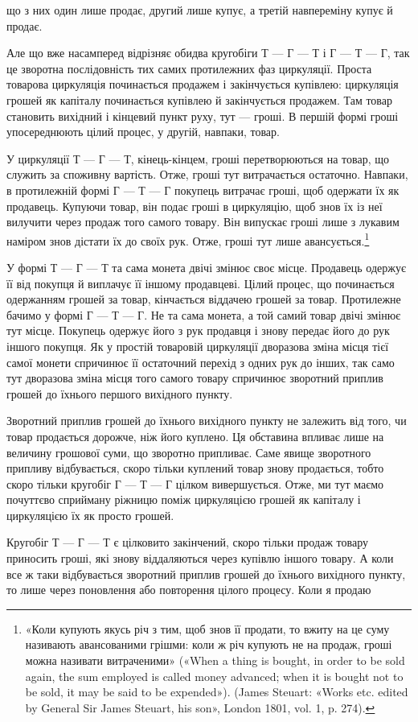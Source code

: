 що з них один лише продає, другий лише купує, а третій навпереміну
купує й продає.

Але що вже насамперед відрізняє обидва кругобіги Т — Г — Т
і Г — Т — Г, так це зворотна послідовність тих самих протилежних
фаз циркуляції. Проста товарова циркуляція починається
продажем і закінчується купівлею: циркуляція грошей як капіталу
починається купівлею й закінчується продажем. Там
товар становить вихідний і кінцевий пункт руху, тут — гроші.
В першій формі гроші упосереднюють цілий процес, у другій,
навпаки, товар.

У циркуляції Т — Г — Т, кінець-кінцем, гроші перетворюються
на товар, що служить за споживну вартість. Отже, гроші
тут витрачається остаточно. Навпаки, в протилежній формі
Г — Т — Г покупець витрачає гроші, щоб одержати їх як продавець.
Купуючи товар, він подає гроші в циркуляцію, щоб
знов їх із неї вилучити через продаж того самого товару. Він
випускає гроші лише з лукавим наміром знов дістати їх до своїх
рук. Отже, гроші тут лише авансується.\footnote{
«Коли купують якусь річ з тим, щоб знов її продати, то вжиту
на це суму називають авансованими грішми: коли ж річ купують не
на продаж, гроші можна називати витраченими» («When a thing is bought,
in order to be sold again, the sum employed is called money advanced;
when it is bought not to be sold, it may be said to be expended»). (James
Steuart: «Works etc. edited by General Sir James Steuart, his son», London
1801, vol. 1, p. 274).
}

У формі Т — Г — Т та сама монета двічі змінює своє місце.
Продавець одержує її від покупця й виплачує її іншому продавцеві.
Цілий процес, що починається одержанням грошей за товар,
кінчається віддачею грошей за товар. Протилежне бачимо у
формі Г — Т — Г. Не та сама монета, а той самий товар двічі
змінює тут місце. Покупець одержує його з рук продавця і знову
передає його до рук іншого покупця. Як у простій товаровій
циркуляції дворазова зміна місця тієї самої монети спричинює
її остаточний перехід з одних рук до інших, так само тут дворазова
зміна місця того самого товару спричинює зворотний приплив
грошей до їхнього першого вихідного пункту.

Зворотний приплив грошей до їхнього вихідного пункту не
залежить від того, чи товар продається дорожче, ніж його куплено.
Ця обставина впливає лише на величину грошової суми, що зворотно
припливає. Саме явище зворотного припливу відбувається,
скоро тільки куплений товар знову продається, тобто скоро
тільки кругобіг Г — Т — Г цілком вивершується. Отже, ми тут
маємо почуттєво сприйману ріжницю поміж циркуляцією грошей
як капіталу і циркуляцією їх як просто грошей.

Кругобіг Т — Г — Т є цілковито закінчений, скоро тільки
продаж товару приносить гроші, які знову віддаляються через
купівлю іншого товару. А коли все ж таки відбувається зворотний
приплив грошей до їхнього вихідного пункту, то лише через
поновлення або повторення цілого процесу. Коли я продаю